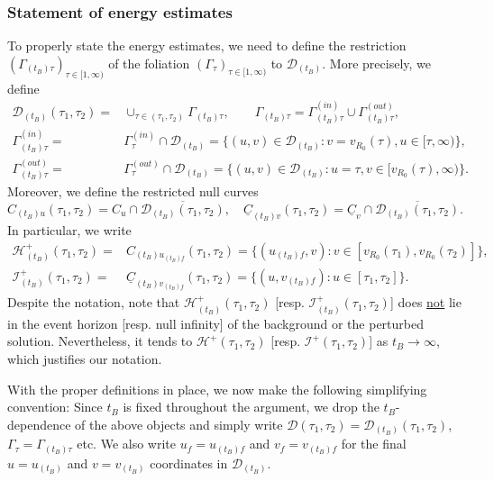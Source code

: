 \documentclass[10pt, reqno]{amsart}
\theoremstyle{definition}
\theoremstyle{remark}
\theoremstyle{conjecture}
\numberwithin{equation}{section}
\newcommand{\set}[1]{\{#1\}}
\newcommand{\0}{\emptyset}
\newcommand{\Gmm}{\Gamma}
\newcommand{\calD}{\mathcal D}
\newcommand{\calH}{\mathcal H}
\newcommand{\calI}{\mathcal I}
\newcommand{\uC}{\underline{C}}
\newcommand{\EH}{\calH^{+}}
\newcommand{\NI}{\calI^{+}}						%
\begin{document}
\subsubsection*{Statement of energy estimates}
To properly state the energy estimates, we need to define the restriction $(\Gmm_{(t_{B}) \tau})_{\tau \in [1, \infty)}$ of the foliation $(\Gmm_{\tau})_{\tau \in [1, \infty)}$ to $\calD_{(t_{B})}$. More precisely, we define
\begin{align*}
	\calD_{(t_{B})}(\tau_{1}, \tau_{2}) =& \cup_{\tau \in (\tau_{1}, \tau_{2})} \Gmm_{(t_{B}) \tau}, \qquad 
	\Gmm_{(t_{B}) \tau} =  \Gmm_{(t_{B}) \tau}^{(in)} \cup \Gmm_{(t_{B}) \tau}^{(out)} , \\
	\Gmm_{(t_{B}) \tau}^{(in)} =& \Gmm_{\tau}^{(in)} \cap \calD_{(t_{B})} = \set{(u, v) \in \calD_{(t_{B})} : v = v_{R_{0}}(\tau), u \in [\tau, \infty)} , \\
	\Gmm_{(t_{B}) \tau}^{(out)} =& \Gmm_{\tau}^{(out)} \cap \calD_{(t_{B})} = \set{(u, v) \in \calD_{(t_{B})} : u = \tau, v \in [v_{R_{0}}(\tau), \infty)} .
\end{align*}
Moreover, we define the restricted null curves
\begin{equation*}
	C_{(t_{B}) u}(\tau_{1}, \tau_{2}) = C_{u} \cap \overline{\calD_{(t_{B})}(\tau_{1}, \tau_{2})}, \quad
	\uC_{(t_{B}) v}(\tau_{1}, \tau_{2}) = \uC_{v} \cap \overline{\calD_{(t_{B})}(\tau_{1}, \tau_{2})}.
\end{equation*}
In particular, we write
\begin{align*}
	\EH_{(t_{B})} (\tau_{1}, \tau_{2}) 
	= & C_{(t_{B}) u_{(t_{B}) f}}(\tau_{1}, \tau_{2})
	= \set{(u_{(t_{B}) f}, v) : v \in [v_{R_{0}}(\tau_{1}), v_{R_{0}}(\tau_{2})]}, \\
	\NI_{(t_{B})} (\tau_{1}, \tau_{2}) 
	= & \uC_{(t_{B}) v_{(t_{B}) f}}(\tau_{1}, \tau_{2})
	= \set{(u, v_{(t_{B}) f}) : u \in [\tau_{1}, \tau_{2}]}.
\end{align*}
Despite the notation, note that $\EH_{(t_{B})}(\tau_{1}, \tau_{2})$ [resp. $\NI_{(t_{B})}(\tau_{1}, \tau_{2})$] does \underline{not} lie in the event horizon [resp. null infinity] of the background or the perturbed solution. Nevertheless, it tends to $\EH(\tau_{1}, \tau_{2})$ [resp. $\NI(\tau_{1}, \tau_{2})$] as $t_{B} \to \infty$, which justifies our notation.

With the proper definitions in place, we now make the following simplifying convention: Since $t_{B}$ is fixed throughout the argument, we drop the $t_{B}$-dependence of the above objects and simply write $\calD(\tau_{1}, \tau_{2}) = \calD_{(t_{B})}(\tau_{1}, \tau_{2})$, $\Gmm_{\tau} = \Gmm_{(t_{B}) \tau}$ etc. We also write $u_{f} = u_{(t_{B}) f}$ and $v_{f} = v_{(t_{B}) f}$ for the final $u = u_{(t_{B})}$ and $v = v_{(t_{B})}$ coordinates in $\calD_{(t_{B})}$.
\end{document}
